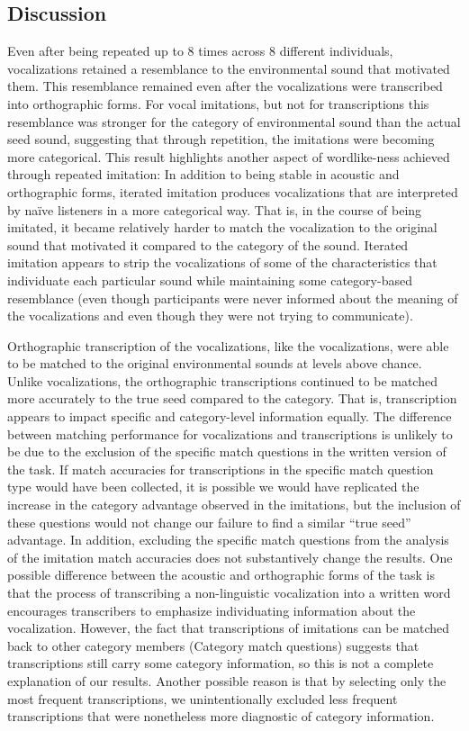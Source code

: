 \documentclass[english,floatsintext,man]{apa6}
\theoremstyle{definition}
\theoremstyle{definition}
\theoremstyle{definition}
\theoremstyle{remark}
\begin{document}
\hypertarget{discussion-1}{%
\subsection{Discussion}\label{discussion-1}}

Even after being repeated up to 8 times across 8 different individuals,
vocalizations retained a resemblance to the environmental sound that
motivated them. This resemblance remained even after the vocalizations
were transcribed into orthographic forms. For vocal imitations, but not
for transcriptions this resemblance was stronger for the category of
environmental sound than the actual seed sound, suggesting that through
repetition, the imitations were becoming more categorical. This result
highlights another aspect of wordlike-ness achieved through repeated
imitation: In addition to being stable in acoustic and orthographic
forms, iterated imitation produces vocalizations that are interpreted by
naïve listeners in a more categorical way. That is, in the course of
being imitated, it became relatively harder to match the vocalization to
the original sound that motivated it compared to the category of the
sound. Iterated imitation appears to strip the vocalizations of some of
the characteristics that individuate each particular sound while
maintaining some category-based resemblance (even though participants
were never informed about the meaning of the vocalizations and even
though they were not trying to communicate).

Orthographic transcription of the vocalizations, like the vocalizations,
were able to be matched to the original environmental sounds at levels
above chance. Unlike vocalizations, the orthographic transcriptions
continued to be matched more accurately to the true seed compared to the
category. That is, transcription appears to impact specific and
category-level information equally. The difference between matching
performance for vocalizations and transcriptions is unlikely to be due
to the exclusion of the specific match questions in the written version
of the task. If match accuracies for transcriptions in the specific
match question type would have been collected, it is possible we would
have replicated the increase in the category advantage observed in the
imitations, but the inclusion of these questions would not change our
failure to find a similar \enquote{true seed} advantage. In addition,
excluding the specific match questions from the analysis of the
imitation match accuracies does not substantively change the results.
One possible difference between the acoustic and orthographic forms of
the task is that the process of transcribing a non-linguistic
vocalization into a written word encourages transcribers to emphasize
individuating information about the vocalization. However, the fact that
transcriptions of imitations can be matched back to other category
members (Category match questions) suggests that transcriptions still
carry some category information, so this is not a complete explanation
of our results. Another possible reason is that by selecting only the
most frequent transcriptions, we unintentionally excluded less frequent
transcriptions that were nonetheless more diagnostic of category
information.
\end{document}
